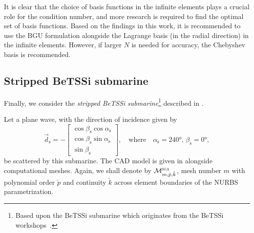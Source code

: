 It is clear that the choice of basis functions in the infinite elements plays a crucial role for the condition number, and more research is required to find the optimal set of basis functions. Based on the findings in this work, it is recommended to use the BGU formulation alongside the Lagrange basis (in the radial direction) in the infinite elements. However, if larger $N$ is needed for accuracy, the Chebyshev basis is recommended.

\subsection{Stripped BeTSSi submarine}
Finally, we consider the \textit{stripped BeTSSi submarine}\footnote{Based upon the BeTSSi submarine which originates from the BeTSSi workshops~\cite{Gilroy2013bib}.} described in . 

Let a plane wave, with the direction of incidence given by
\begin{equation}
	\vec{d}_{\mathrm{s}} = -\begin{bmatrix}
		\cos\beta_{\mathrm{s}}\cos\alpha_{\mathrm{s}}\\
		\cos\beta_{\mathrm{s}}\sin\alpha_{\mathrm{s}}\\
		\sin\beta_{\mathrm{s}}
	\end{bmatrix}, \quad\text{where}\quad \alpha_{\mathrm{s}} = \ang{240},\,\beta_{\mathrm{s}} = \ang{0},
\end{equation}
be scattered by this submarine. The CAD model is given in  alongside computational meshes. Again, we shall denote by ${\cal M}_{m,\check{p},\check{k}}^{\textsc{iga}}$, mesh number $m$ with polynomial order $\check{p}$ and continuity $\check{k}$ across element boundaries of the NURBS parametrization. 

